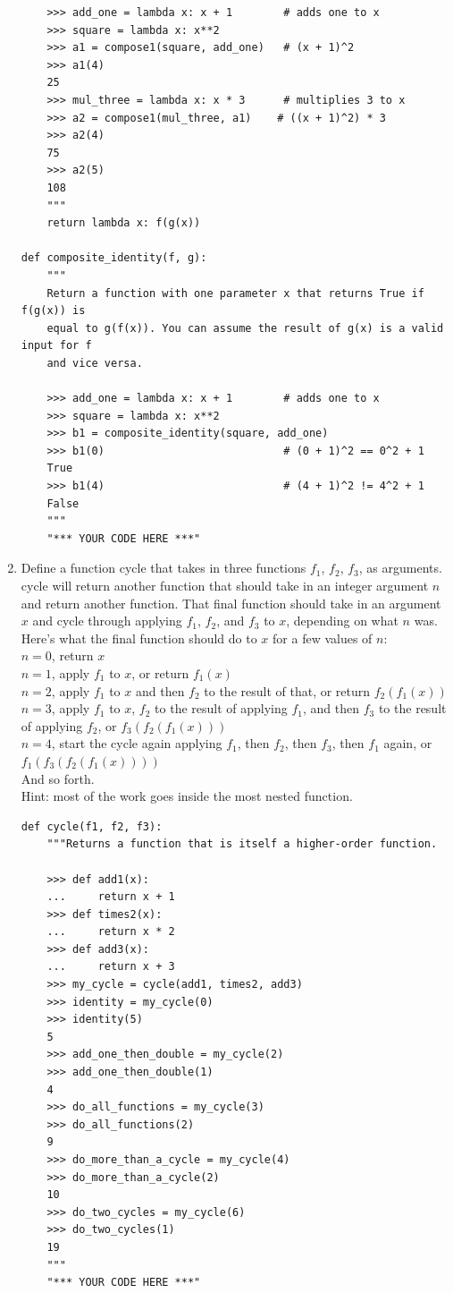 \documentclass[11pt]{article}
\begin{document}
\begin{enumerate}[leftmargin = *]
\begin{lstlisting}
    >>> add_one = lambda x: x + 1        # adds one to x
    >>> square = lambda x: x**2
    >>> a1 = compose1(square, add_one)   # (x + 1)^2
    >>> a1(4)
    25
    >>> mul_three = lambda x: x * 3      # multiplies 3 to x
    >>> a2 = compose1(mul_three, a1)    # ((x + 1)^2) * 3
    >>> a2(4)
    75
    >>> a2(5)
    108
    """
    return lambda x: f(g(x))

def composite_identity(f, g):
    """
    Return a function with one parameter x that returns True if f(g(x)) is
    equal to g(f(x)). You can assume the result of g(x) is a valid input for f
    and vice versa.

    >>> add_one = lambda x: x + 1        # adds one to x
    >>> square = lambda x: x**2
    >>> b1 = composite_identity(square, add_one)
    >>> b1(0)                            # (0 + 1)^2 == 0^2 + 1
    True
    >>> b1(4)                            # (4 + 1)^2 != 4^2 + 1
    False
    """
    "*** YOUR CODE HERE ***"
\end{lstlisting}
\newpage
\item 
Define a function cycle that takes in three functions $f_1$, $f_2$, $f_3$, as arguments. cycle will return another function that should take in an integer argument $n$ and return another function. That final function should take in an argument $x$ and cycle through applying $f_1$, $f_2$, and $f_3$ to $x$, depending on what $n$ was. Here's what the final function should do to $x$ for a few values of $n$:\\
$n = 0$, return $x$ \\
$n = 1$, apply $f_1$ to $x$, or return $f_1(x)$ \\
$n = 2$, apply $f_1$ to $x$ and then $f_2$ to the result of that, or return $f_2(f_1(x))$ \\
$n = 3$, apply $f_1$ to $x$, $f_2$ to the result of applying $f_1$, and then $f_3$ to the result of applying $f_2$, or $f_3(f_2(f_1(x)))$ \\ 
$n = 4$, start the cycle again applying $f_1$, then $f_2$, then $f_3$, then $f_1$ again, or $f_1(f_3(f_2(f_1(x))))$ \\ 
And so forth.\\
Hint: most of the work goes inside the most nested function.
\begin{lstlisting}
def cycle(f1, f2, f3):
    """Returns a function that is itself a higher-order function.

    >>> def add1(x):
    ...     return x + 1
    >>> def times2(x):
    ...     return x * 2
    >>> def add3(x):
    ...     return x + 3
    >>> my_cycle = cycle(add1, times2, add3)
    >>> identity = my_cycle(0)
    >>> identity(5)
    5
    >>> add_one_then_double = my_cycle(2)
    >>> add_one_then_double(1)
    4
    >>> do_all_functions = my_cycle(3)
    >>> do_all_functions(2)
    9
    >>> do_more_than_a_cycle = my_cycle(4)
    >>> do_more_than_a_cycle(2)
    10
    >>> do_two_cycles = my_cycle(6)
    >>> do_two_cycles(1)
    19
    """
    "*** YOUR CODE HERE ***"
\end{lstlisting}
\end{enumerate}
\end{document}
